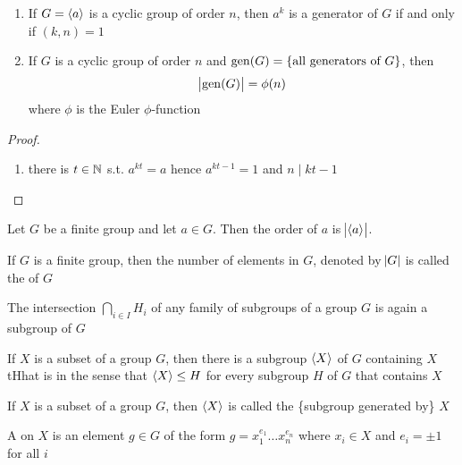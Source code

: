 \documentclass[11pt]{article}
\begin{document}
\begin{theorem}[]
\begin{enumerate}
\item If \(G=\langle a\rangle\) is a cyclic group of order \(n\), then \(a^k\) is a generator
of \(G\) if and only if \((k,n)=1\)
\item If \(G\) is a cyclic group of order \(n\) and \(\operatorname{gen}(G)=\{\text{all generators
      of } G\}\), then
\begin{equation*}
\abs{\operatorname{gen}(G)}=\phi(n)
\end{equation*}
where \(\phi\) is the Euler \(\phi\)-function
\end{enumerate}
\end{theorem}
\begin{proof}
\begin{enumerate}
\item there is \(t\in\mathbb{N}\) s.t. \(a^{kt}=a\) hence \(a^{kt-1}=1\) and \(n\mid kt-1\)
\end{enumerate}
\end{proof}

\begin{proposition}[]
Let \(G\) be a finite group and let \(a\in G\). Then the order of \(a\) is
\(\abs{\langle a\rangle}\).
\end{proposition}

\begin{definition}[]
If \(G\) is a finite group, then the number of elements in \(G\), denoted by
\(\abs{G}\) is called the  of \(G\)
\end{definition}


\begin{proposition}[]
The intersection \(\bigcap_{i\in I}H_i\) of any family of subgroups of a group
\(G\) is again a subgroup of \(G\)
\end{proposition}


\begin{corollary}[]
If \(X\) is a subset of a group \(G\), then there is a subgroup \(\langle X\rangle\) of \(G\)
containing \(X\) tHhat is  in the sense that \(\langle X\rangle\le H\) for
every subgroup \(H\) 
of \(G\) that contains \(X\)
\end{corollary}


\begin{definition}[]
If \(X\) is a subset of a group \(G\), then \(\langle X\rangle\) is called the \tf\{subgroup
generated by\} \(X\)
\end{definition}

A  on \(X\) is an element \(g\in G\) of the form \(g=x_1^{e_1}\dots
   x_n^{e_n}\) where \(x_i\in X\) and \(e_i=\pm 1\) for all \(i\)
\end{document}
